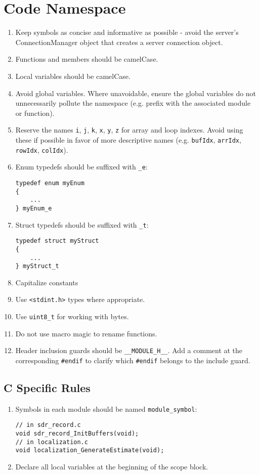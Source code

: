 \documentclass{article}
\begin{document}
\section{Code Namespace}
\begin{enumerate}
    \item Keep symbols as concise and informative as possible - avoid the server’s ConnectionManager object that creates a server connection object.
    \item Functions and members should be camelCase.
    \item Local variables should be camelCase.
    \item Avoid global variables.  Where unavoidable, ensure the global variables do not unnecessarily pollute the namespace (e.g. prefix with the associated module or function).
    \item Reserve the names \lstinline{i}, \lstinline{j}, \lstinline{k}, \lstinline{x}, \lstinline{y}, \lstinline{z} for array and loop indexes.  Avoid using these if possible in favor of more descriptive names (e.g. \lstinline{bufIdx}, \lstinline{arrIdx}, \lstinline{rowIdx}, \lstinline{colIdx}).
    \item Enum typedefs should be suffixed with \lstinline{_e}:
\begin{lstlisting}
typedef enum myEnum
{
    ...
} myEnum_e
\end{lstlisting}
    \item Struct typedefs should be suffixed with \lstinline{_t}:
\begin{lstlisting}
typedef struct myStruct
{
    ...
} myStruct_t
\end{lstlisting}
    \item Capitalize constants
    \item Use \lstinline{<stdint.h>} types where appropriate.
    \item Use \lstinline{uint8_t} for working with bytes.
    \item Do not use macro magic to rename functions.
    \item Header inclusion guards should be \lstinline{__MODULE_H__}.  Add a comment at the corresponding \lstinline{#endif} to clarify which \lstinline{#endif} belongs to the include guard.
\end{enumerate}

\subsection{C Specific Rules}
\begin{enumerate}
    \item Symbols in each module should be named \lstinline{module_symbol}:
\begin{lstlisting}
// in sdr_record.c
void sdr_record_InitBuffers(void);
// in localization.c
void localization_GenerateEstimate(void);
\end{lstlisting}
    \item Declare all local variables at the beginning of the scope block.
\end{enumerate}
\end{document}
